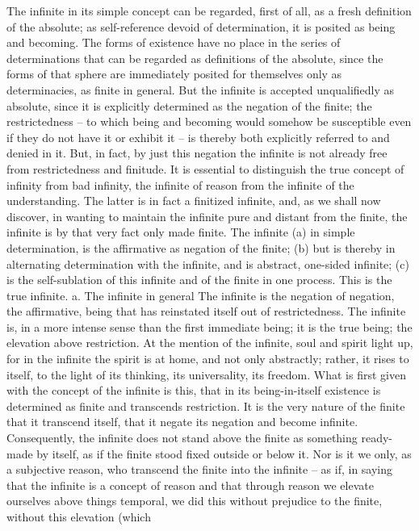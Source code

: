 The infinite in its simple concept can be regarded, first of all, as a fresh
definition of the absolute; as self-reference devoid of determination, it is
posited as being and becoming. The forms of existence have no place in the
series of determinations that can be regarded as definitions of the absolute,
since the forms of that sphere are immediately posited for themselves
only as determinacies, as finite in general. But the infinite is accepted
unqualifiedly as absolute, since it is explicitly determined as the negation
of the finite; the restrictedness – to which being and becoming would
somehow be susceptible even if they do not have it or exhibit it – is thereby
both explicitly referred to and denied in it.
But, in fact, by just this negation the infinite is not already free from
restrictedness and finitude. It is essential to distinguish the true concept
of infinity from bad infinity, the infinite of reason from the infinite of the
understanding. The latter is in fact a finitized infinite, and, as we shall now
discover, in wanting to maintain the infinite pure and distant from the
finite, the infinite is by that very fact only made finite.
The infinite
(a) in simple determination, is the affirmative as negation of the finite;
(b) but is thereby in alternating determination with the infinite, and is
abstract, one-sided infinite;
(c) is the self-sublation of this infinite and of the finite in one process. This
is the true infinite.
a. The infinite in general
The infinite is the negation of negation, the affirmative, being that has
reinstated itself out of restrictedness. The infinite is, in a more intense
sense than the first immediate being; it is the true being; the elevation
above restriction. At the mention of the infinite, soul and spirit light up,
for in the infinite the spirit is at home, and not only abstractly; rather, it
rises to itself, to the light of its thinking, its universality, its freedom.
What is first given with the concept of the infinite is this, that in its
being-in-itself existence is determined as finite and transcends restriction.
It is the very nature of the finite that it transcend itself, that it negate its
negation and become infinite. Consequently, the infinite does not stand
above the finite as something ready-made by itself, as if the finite stood fixed
outside or below it. Nor is it we only, as a subjective reason, who transcend
the finite into the infinite – as if, in saying that the infinite is a concept of
reason and that through reason we elevate ourselves above things temporal,
we did this without prejudice to the finite, without this elevation (which
